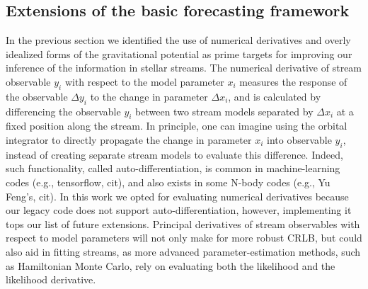\documentclass[modern]{aastex61}
\newcommand{\acronym}[1]{{\small{#1}}}
\newcommand{\CRLB}{\acronym{CRLB}}
\begin{document}
\subsection{Extensions of the basic forecasting framework}
\label{sec:dis_extensions}
In the previous section we identified the use of numerical derivatives and overly idealized forms of the gravitational potential as prime targets for improving our inference of the information in stellar streams.
The numerical derivative of stream observable $y_i$ with respect to the model parameter $x_i$ measures the response of the observable $\Delta y_i$ to the change in parameter $\Delta x_i$, and is calculated by differencing the observable $y_i$ between two stream models separated by $\Delta x_i$ at a fixed position along the stream.
In principle, one can imagine using the orbital integrator to directly propagate the change in parameter $x_i$ into observable $y_i$, instead of creating separate stream models to evaluate this difference.
Indeed, such functionality, called auto-differentiation, is common in machine-learning codes (e.g., tensorflow, cit), and also exists in some N-body codes (e.g., Yu Feng's, cit).
In this work we opted for evaluating numerical derivatives because our legacy code does not support auto-differentiation, however, implementing it tops our list of future extensions.
Principal derivatives of stream observables with respect to model parameters will not only make for more robust \CRLB, but could also aid in fitting streams, as more advanced parameter-estimation methods, such as Hamiltonian Monte Carlo, rely on evaluating both the likelihood and the likelihood derivative.
\end{document}
